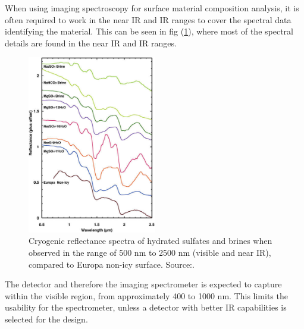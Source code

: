 When using imaging spectroscopy for surface material composition analysis, it is often required to work in the near IR and IR ranges to cover the spectral data identifying the material. This can be seen in fig (\ref{fig:material_assessment_spectra}), where most of the spectral details are found in the near IR and IR ranges.
\begin{figure}[htb!]
\centering
\includegraphics[width=0.5\textwidth]{figures/Orbiter/surface_assessment_sulfate_brine}
\caption{Cryogenic reflectance spectra of hydrated sulfates and brines when observed in the range of 500 nm to 2500 nm (visible and near IR), compared to Europa non-icy surface. Source:\cite{pappalardo2013a}.}
\label{fig:material_assessment_spectra}
\end{figure}
The detector and therefore the imaging spectrometer is expected to capture within the visible region, from approximately 400 to 1000 nm. This limits the usability for the spectrometer, unless a detector with better IR capabilities is selected for the design.
